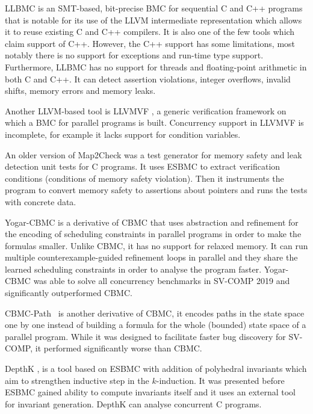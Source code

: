 LLBMC  is an SMT-based, bit-precise BMC for
sequential C and C++ programs that is notable for its use of the LLVM
intermediate representation which allows it to reuse existing C and C++
compilers.
It is also one of the few tools which claim support of C++.
However, the C++ support has some limitations, most notably there is no
support for exceptions and run-time type support.
Furthermore, LLBMC has no support for threads and floating-point arithmetic in
both C and C++.
It can detect assertion violations, integer overflows, invalid shifts, memory
errors and memory leaks.

Another LLVM-based tool is LLVMVF , a generic verification framework on which a BMC for parallel programs is built.
Concurrency support in LLVMVF is incomplete, for example it lacks support for condition variables.

An older version of Map2Check  was a test generator for memory safety and leak detection unit tests for C programs.
It uses ESBMC to extract verification conditions (conditions of memory safety violation).
Then it instruments the program to convert memory safety to assertions about pointers and runs the tests with concrete data.

Yogar-CBMC  is a derivative of CBMC that uses
abstraction and refinement for the encoding of scheduling constraints in
parallel programs in order to make the formulas smaller.
Unlike CBMC, it has no support for relaxed memory.
It can run multiple counterexample-guided refinement loops in parallel and they
share the learned scheduling constraints in order to analyse the program
faster.
Yogar-CBMC was able to solve all concurrency benchmarks in SV-COMP 2019 and significantly outperformed CBMC.

CBMC-Path~ is another derivative of CBMC, it encodes paths in
the state space one by one instead of building a formula for the whole
(bounded) state space of a parallel program.
While it was designed to facilitate faster bug discovery for SV-COMP, it performed significantly worse than CBMC.

DepthK , is a tool based on ESBMC with
addition of polyhedral invariants which aim to strengthen inductive step in the
$k$-induction.
It was presented before ESBMC gained ability to compute invariants itself and it uses an external tool for invariant generation.
DepthK can analyse concurrent C programs.

